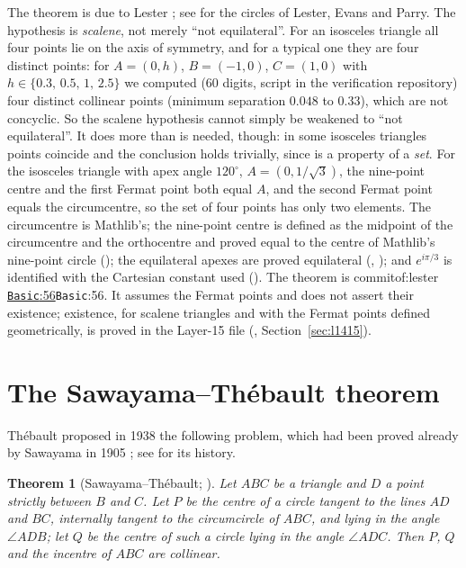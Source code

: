 \documentclass[11pt]{article}
\newtheorem{theorem}{Theorem}
\theoremstyle{definition}
\theoremstyle{remark}
\newcommand{\commitof}[1]{\csname commitof:#1\endcsname}
\newcommand{\repo}[1]{https://github.com/jpbald93/#1}
\newcommand{\src}[4]{\ifcsname commitof:#1\endcsname
  \href{\repo{#1}/blob/\commitof{#1}/#2/#3.lean\#L#4}{\texttt{#3}:#4}\else\texttt{#3}:#4\fi}
\begin{document}
The theorem is due to Lester \cite{lester1997}; see \cite{yiu2010} for the circles of Lester, Evans
and Parry. The hypothesis is \emph{scalene}, not merely ``not equilateral''. For an isosceles triangle
all four points lie on the axis of symmetry, and for a typical one they are four distinct points: for
$A=(0,h)$, $B=(-1,0)$, $C=(1,0)$ with $h\in\{0.3,\,0.5,\,1,\,2.5\}$ we computed (60 digits, script in the verification repository) four distinct collinear
points (minimum separation $0.048$ to $0.33$), which are not concyclic. So the scalene hypothesis cannot
simply be weakened to ``not equilateral''. It does more than is needed, though: in some isosceles
triangles points coincide and the conclusion holds trivially, since  is a property of
a \emph{set}. For the isosceles triangle with apex angle $120^\circ$, $A=(0,1/\sqrt3)$, the nine-point
centre and the first Fermat point both equal $A$, and the second Fermat point equals the circumcentre,
so the set of four points has only two elements.
The circumcentre is Mathlib's; the nine-point centre is defined as the midpoint of the circumcentre and
the orthocentre and proved equal to the centre of Mathlib's nine-point circle
(); the equilateral apexes are proved equilateral
(, ); and $e^{i\pi/3}$ is identified with the
Cartesian constant used (). The theorem is \src{lester}{Lester}{Basic}{56}. It
assumes the Fermat points and does not assert their existence; existence, for scalene triangles and
with the Fermat points defined geometrically, is proved in the Layer-15 file
(, Section~\ref{sec:l1415}).

\section{The Sawayama--Th\'ebault theorem}\label{sec:thebault}

Th\'ebault proposed in 1938 \cite{thebault1938} the following problem, which had been proved already
by Sawayama in 1905 \cite{sawayama1905}; see \cite{ayme2003} for its history.

\begin{theorem}[Sawayama--Th\'ebault; ]\label{thm:thebault}
Let $ABC$ be a triangle and $D$ a point strictly between $B$ and $C$. Let $P$ be the centre of a
circle tangent to the lines $AD$ and $BC$, internally tangent to the circumcircle of $ABC$, and lying in
the angle $\angle ADB$; let $Q$ be the centre of such a circle lying in the angle $\angle ADC$. Then
$P$, $Q$ and the incentre of $ABC$ are collinear.
\end{theorem}
\end{document}
